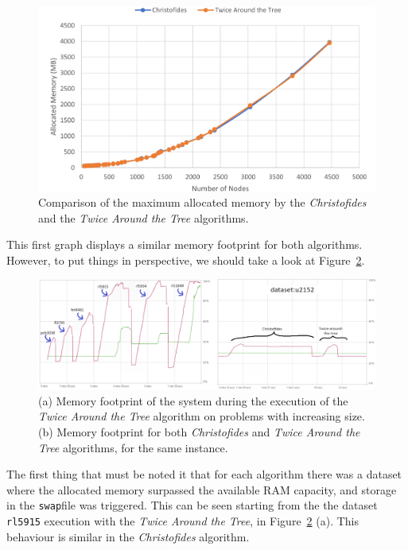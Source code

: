 \documentclass[12pt]{article}
\begin{document}
\begin{figure}[ht]
\centering
\includegraphics[height=.325\textheight]{images/memory_use_comparison.png}
\caption{Comparison of the maximum allocated memory by the \textit{Christofides} and the \textit{Twice Around the Tree} algorithms.}
\label{fig:mem_use}
\end{figure}

This first graph displays a similar memory footprint for both algorithms. However, to put things in perspective, 
we should take a look at Figure~\ref{fig:memory_behaviour}.

\begin{figure}[ht]
\centering
\includegraphics[width=\textwidth]{images/memory_profile_comparison.png}
\caption{(a) Memory footprint of the system during the execution of the \textit{Twice Around the Tree} algorithm on problems with increasing size. (b) Memory footprint for both \textit{Christofides} and \textit{Twice Around the Tree} algorithms, for the same instance.}
\label{fig:memory_behaviour}
\end{figure}

The first thing that must be noted it that for each algorithm there was a dataset where the allocated memory surpassed 
the available RAM capacity, and storage in the \texttt{swap}\footnotemark file was triggered. This can be seen starting from the the dataset \texttt{rl5915} execution with the \textit{Twice Around the Tree}, 
in Figure~\ref{fig:memory_behaviour} (a). This behaviour is similar in the \textit{Christofides} algorithm.
\end{document}
